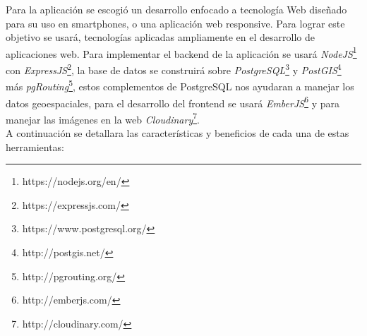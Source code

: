 
Para la aplicación se escogió un desarrollo enfocado a tecnología Web diseñado para su uso en smartphones, o una aplicación web responsive. Para lograr este objetivo se usará, tecnologías aplicadas ampliamente en el desarrollo de aplicaciones web.
Para implementar el backend de la aplicación se usará \emph{NodeJS}\footnote{https://nodejs.org/en/} con \emph{ExpressJS}\footnote{https://expressjs.com/}, la base de datos se construirá sobre \emph{PostgreSQL}\footnote{https://www.postgresql.org/} y \emph{PostGIS}\footnote{http://postgis.net/} más \emph{pgRouting}\footnote{http://pgrouting.org/}, estos complementos de PostgreSQL nos ayudaran a manejar los datos geoespaciales, para el desarrollo del frontend se usará \emph{EmberJS}\footnote{http://emberjs.com/} y para manejar las imágenes en la web \emph{Cloudinary}\footnote{http://cloudinary.com/}.\\

A continuación se detallara las características y beneficios de cada una de estas herramientas:
